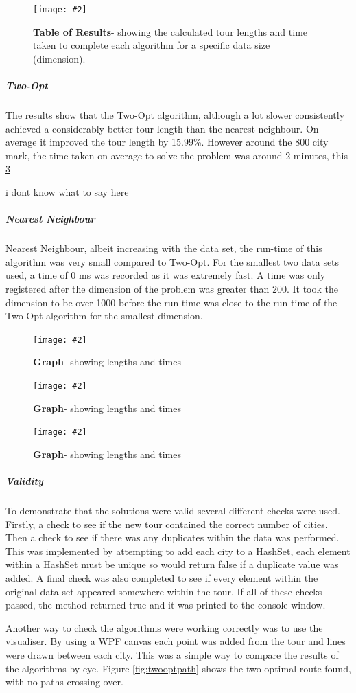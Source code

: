 \documentclass[10pt, a4paper]{article}
\newcommand{\figuremacro}[5]{
    \begin{figure}[#1]
        \centering
        \texttt{[image: \#2]}
        \caption[#3]{\textbf{#3}#4}
        \label{fig:#2}
    \end{figure}
}
\newcommand{\figuremacroF}[5]{
	\begin{figure}[#1]
		\centering
		\texttt{[image: \#2]}
		\caption[#3]{\textbf{#3}#4}
		\label{fig:#2}
	\end{figure}
}
\begin{document}
	\figuremacro{h}{Table}{Table of Results}{- showing the calculated tour lengths and time taken to complete each algorithm for a specific data size (dimension).}{1.0}
	
	\subparagraph{Two-Opt} The results show that the Two-Opt algorithm, although a lot slower consistently achieved a considerably better tour length than the nearest neighbour. On average it improved the tour length by 15.99\%. However around the 800 city mark, the time taken on average to solve the problem was around 2 minutes, this  \ref{fig:twotime}
	
	i dont know what to say here
	
	\subparagraph{Nearest Neighbour} Nearest Neighbour, albeit increasing with the data set, the run-time of this algorithm was very small compared to Two-Opt. For the smallest two data sets used, a time of 0 ms was recorded as it was extremely fast. A time was only registered after the dimension of the problem was greater than 200. It took the dimension to be over 1000 before the run-time was close to the run-time of the Two-Opt algorithm for the smallest dimension.

	
	\figuremacroF{H}{nntime}{Graph}{- showing lengths and times}{1.0}
	
	\figuremacroF{H}{twotime}{Graph}{- showing lengths and times}{1.0}
	
	\clearpage
	\figuremacroF{H}{comparison}{Graph}{- showing lengths and times}{1.0}

		\newpage
		\clearpage
	\subparagraph{Validity}
	To demonstrate that the solutions were valid several different checks were used. Firstly, a check to see if the new tour contained the correct number of cities. Then a check to see if there was any duplicates within the data was performed. This was implemented by attempting to add each city to a HashSet, each element within a HashSet must be unique so would return false if a duplicate value was added. A final check was also completed to see if every element within the original data set appeared somewhere within the tour.	If all of these checks passed, the method returned true and it was printed to the console window.
	
	Another way to check the algorithms were working correctly was to use the visualiser. By using a WPF canvas each point was added from the tour and lines were drawn between each city. This was a simple way to compare the results of the algorithms by eye. Figure \ref{fig:twooptpath} shows the two-optimal route found, with no paths crossing over. 
	
\end{document}
